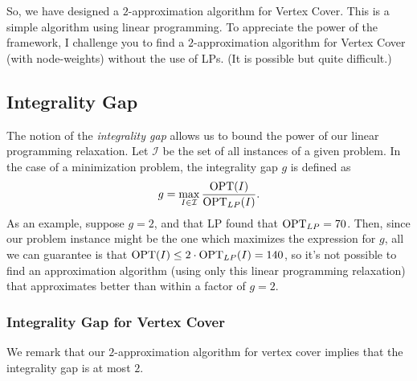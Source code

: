 

So, we have designed a $2$-approximation algorithm for Vertex Cover. This is a simple algorithm
using linear programming. To appreciate the power of the framework, I challenge you to find a
$2$-approximation algorithm for Vertex Cover (with node-weights) without the use of LPs. (It is
possible but quite difficult.)

\subsection{Integrality Gap}

The notion of the \emph{integrality gap} allows us to bound the power of our linear programming
relaxation. Let $\mathcal{I}$ be the set of all instances of a given problem. In the case of a
minimization problem, the integrality gap $g$ is defined as
\[
  g=\max_{I\in\mathcal{I}}\frac{\mathrm{OPT}(I)}{\mathrm{OPT}_{LP}(I)}.
\]
As an example, suppose $g=2$, and that LP found that $\mathrm{OPT}_{LP}=70$. Then, since our problem
instance might be the one which maximizes the expression for $g$, all we can guarantee is that
$\mathrm{OPT}(I)\le 2\cdot\mathrm{OPT}_{LP}(I)=140$, so it's not possible to find an approximation algorithm (using
only this linear programming relaxation) that approximates better than within a factor of $g=2$.

\subsubsection{Integrality Gap for Vertex Cover}



We remark that our $2$-approximation algorithm for vertex cover implies that the integrality gap is
at most $2$.


